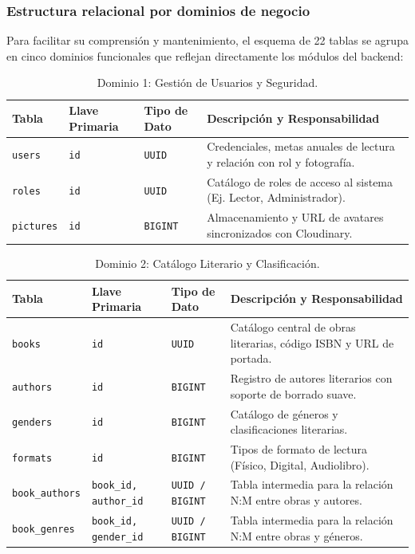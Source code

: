 \documentclass[12pt, atypical, journal]{article}
\begin{document}
\subsubsection{Estructura relacional por dominios de negocio}
Para facilitar su comprensión y mantenimiento, el esquema de 22 tablas se agrupa en cinco dominios funcionales que reflejan directamente los módulos del backend:

\begin{table}[H]
\centering
\footnotesize
\begin{tabular}{|p{3.5cm}|p{2.3cm}|p{2cm}|p{5.5cm}|}
\hline
\textbf{Tabla} & \textbf{Llave Primaria} & \textbf{Tipo de Dato} & \textbf{Descripción y Responsabilidad} \\ \hline
\texttt{users} & \texttt{id} & \texttt{UUID} & Credenciales, metas anuales de lectura y relación con rol y fotografía. \\ \hline
\texttt{roles} & \texttt{id} & \texttt{UUID} & Catálogo de roles de acceso al sistema (Ej. Lector, Administrador). \\ \hline
\texttt{pictures} & \texttt{id} & \texttt{BIGINT} & Almacenamiento y URL de avatares sincronizados con Cloudinary. \\ \hline
\end{tabular}
\caption{Dominio 1: Gestión de Usuarios y Seguridad.}
\label{tab:db_users}
\end{table}

\begin{table}[H]
\centering
\footnotesize
\begin{tabular}{|p{3.5cm}|p{2.3cm}|p{2cm}|p{5.5cm}|}
\hline
\textbf{Tabla} & \textbf{Llave Primaria} & \textbf{Tipo de Dato} & \textbf{Descripción y Responsabilidad} \\ \hline
\texttt{books} & \texttt{id} & \texttt{UUID} & Catálogo central de obras literarias, código ISBN y URL de portada. \\ \hline
\texttt{authors} & \texttt{id} & \texttt{BIGINT} & Registro de autores literarios con soporte de borrado suave. \\ \hline
\texttt{genders} & \texttt{id} & \texttt{BIGINT} & Catálogo de géneros y clasificaciones literarias. \\ \hline
\texttt{formats} & \texttt{id} & \texttt{BIGINT} & Tipos de formato de lectura (Físico, Digital, Audiolibro). \\ \hline
\texttt{book\_authors} & \texttt{book\_id, author\_id} & \texttt{UUID / BIGINT} & Tabla intermedia para la relación N:M entre obras y autores. \\ \hline
\texttt{book\_genres} & \texttt{book\_id, gender\_id} & \texttt{UUID / BIGINT} & Tabla intermedia para la relación N:M entre obras y géneros. \\ \hline
\end{tabular}
\caption{Dominio 2: Catálogo Literario y Clasificación.}
\label{tab:db_books}
\end{table}
\end{document}
